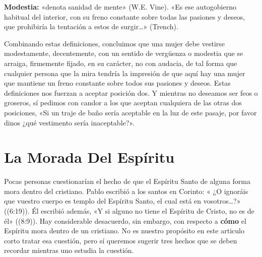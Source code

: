 \documentclass[12pt, twoside, openright]{book}
\begin{document}
\textbf{Modestia:} «denota sanidad de mente» (W.E. Vine). «Es ese autogobierno habitual del interior, con su freno constante sobre todas las pasiones y deseos, que prohibiría la tentación a estos de surgir\ldots» (Trench).

Combinando estas definiciones, concluimos que una mujer debe vestirse modestamente, decentemente, con un sentido de vergüenza o modestia que se arraiga, firmemente fijado, en su carácter, no con audacia, de tal forma que cualquier persona que la mira tendría la impresión de que aquí hay una mujer que mantiene un freno constante sobre todos sus pasiones y deseos. Estas definiciones nos fuerzan a aceptar posición dos. Y mientras no deseamos ser feos o groseros, sí pedimos con candor a los que aceptan cualquiera de las otras dos posiciones, «Si un traje de baño sería aceptable en la luz de este pasaje, por favor dinos ¿qué vestimento sería inaceptable?».

\section{La Morada Del Espíritu}

Pocas personas cuestionarían el hecho de que el Espíritu Santo de alguna forma mora dentro del cristiano. Pablo escribió a los santos en Corinto: « ¿O ignoráis que vuestro cuerpo es templo del Espíritu Santo, el cual está en vosotros…?» ((6:19)). Él escribió además, «Y si alguno no tiene el Espíritu de Cristo, no es de él» ((8:9)). Hay considerable desacuerdo, sin embargo, con respecto a \textbf{cómo} el Espíritu mora dentro de un cristiano. No es nuestro propósito en este articulo corto tratar esa cuestión, pero sí queremos sugerir tres hechos que se deben recordar mientras uno estudia la cuestión.
\end{document}
